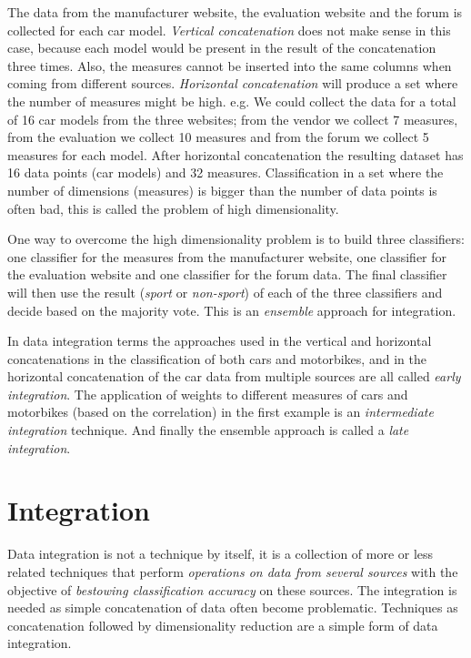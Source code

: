 \documentclass[11pt,a4paper,twoside,openright]{report}
\begin{document}
The data from the manufacturer website, the evaluation website and the forum is
collected for each car model.  \emph{Vertical concatenation} does not make
sense in this case, because each model would be present in the result of the
concatenation three times.  Also, the measures cannot be inserted into the same
columns when coming from different sources.  \emph{Horizontal concatenation}
will produce a set where the number of measures might be high.  e.g. We could
collect the data for a total of 16 car models from the three websites; from the
vendor we collect 7 measures, from the evaluation we collect 10 measures and
from the forum we collect 5 measures for each model.  After horizontal
concatenation the resulting dataset has 16 data points (car models) and 32
measures.  Classification in a set where the number of dimensions (measures) is
bigger than the number of data points is often bad, this is called the problem
of high dimensionality.

One way to overcome the high dimensionality problem is to build three
classifiers:  one classifier for the measures from the manufacturer website,
one classifier for the evaluation website and one classifier for the forum
data.  The final classifier will then use the result (\emph{sport} or
\emph{non-sport}) of each of the three classifiers and decide based on the
majority vote.  This is an \emph{ensemble} approach for integration.

In data integration terms the approaches used in the vertical and horizontal
concatenations in the classification of both cars and motorbikes, and in the
horizontal concatenation of the car data from multiple sources are all called
\emph{early integration}.  The application of weights to different measures of
cars and motorbikes (based on the correlation) in the first example is an
\emph{intermediate integration} technique.  And finally the ensemble approach
is called a \emph{late integration}.

\clearpage{\pagestyle{empty}\cleardoublepage}
\chapter{Integration}

Data integration is not a technique by itself, it is a collection of more or
less related techniques that perform \emph{operations on data from several
sources} with the objective of \emph{bestowing classification accuracy} on
these sources.  The integration is needed as simple concatenation of data often
become problematic.  Techniques as concatenation followed by dimensionality
reduction are a simple form of data integration.
\end{document}
